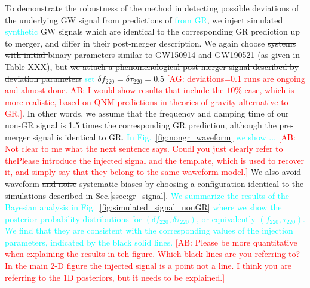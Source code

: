 \documentclass[twocolumn,prd,aps,superscriptaddress,preprintnumbers,tightenlines,showpacs,nofootinbib,eqsecnum,amsfonts,amsmath]{revtex4-1}
\newcommand{\ab}[1]{\textcolor{cyan}{#1}}
\newcommand{\comment}[1]{\textcolor{red}{[#1]}}
\newcommand{\df}[1]{\delta f_{\text{#1}}}
\newcommand{\dtau}[1]{\delta \tau_{\text{#1}}}
\newcommand{\fngr}[1]{f_{\text{#1}}}
\newcommand{\taungr}[1]{\tau_{\text{#1}}}
\begin{document}
To demonstrate the robustness of the method in detecting possible
deviations \sout{of the underlying GW signal from predictions of} \ab{from GR}, 
we inject \sout{simulated} \ab{synthetic} GW signals which are identical to 
the corresponding GR prediction up to merger, and differ in their post-merger
description. We again choose \sout{systems with initial-}binary-parameters
similar to GW150914 and GW190521 (as given in Table XXX), but 
\sout{we attach a phenomenological post-merger signal described by deviation parameters} 
\ab{set} $\df{220} = \dtau{220} = 0.5$ \comment{AG: deviations=0.1 runs are ongoing and almost
  done. AB: I would show results that include the $10\%$ case, which is more realistic, 
based on QNM predictions in theories of gravity alternative to GR.}. 
In other words, we assume that the frequency and damping time
of our non-GR signal is 1.5 times the corresponding GR prediction,
although the pre-merger signal is identical to GR. \ab{In Fig.~\ref{fig:nongr_waveform} 
we show ...}  \comment{AB: Not clear to me what the next sentence says. Coudl 
you just clearly refer to thePlease introduce the injected signal and the template, which is used 
to recover it, and simply say that they belong to the same waweform model.} 
We also avoid waveform \sout{and noise} systematic biases by choosing 
a configuration identical to the simulations described in Sec.\ref{ssec:gr_signal}. \ab{We 
summarize the results of the Bayesian analysis in Fig.~\ref{fig:simulated_signal_nonGR} where we 
show the posterior probability distributions for $(\df{220}, \dtau{220})$, or equivalently
$(\fngr{220}, \taungr{220})$. We find that they are consistent with the corresponding 
values of the injection parameters, indicated by the black solid lines.} \comment{AB: Please be more quantitative when 
explaining the results in teh figure. Which black lines are you referring to? In the main 2-D figure the injected signal 
is a point not a line. I think you are referring to the 1D posteriors, but it needs to be explained.}
\end{document}
